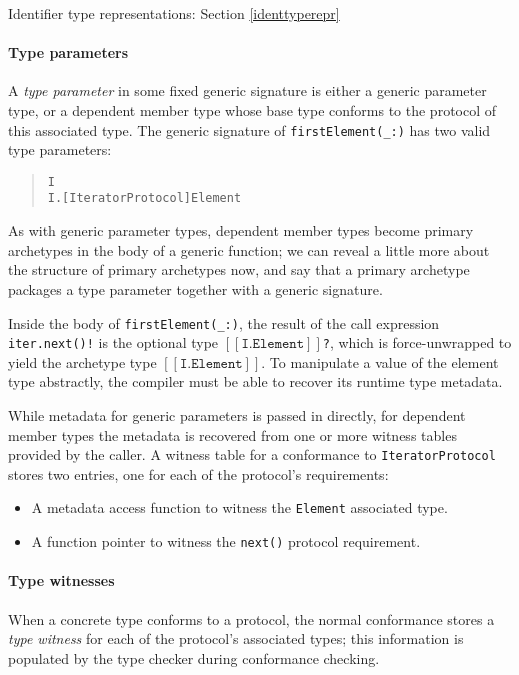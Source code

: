 \documentclass[a4paper,headsepline,bibliography=totoc,toc=flat,fleqn,twoside=semi]{scrbook}
\theoremstyle{definition}
\theoremstyle{definition}
\theoremstyle{definition}
\newcommand{\archetype}[1]{$[\![\texttt{#1}]\!]$}
\begin{document}
\begin{MoreDetails}
\item Identifier type representations: Section \ref{identtyperepr}
\end{MoreDetails}

\paragraph{Type parameters}
A \emph{type parameter} in some fixed generic signature is either a generic parameter type, or a dependent member type whose base type conforms to the protocol of this associated type. The generic signature of \verb|firstElement(_:)| has two valid type parameters:
\begin{quote}
\begin{verbatim}
I
I.[IteratorProtocol]Element
\end{verbatim}
\end{quote}

As with generic parameter types, dependent member types become primary archetypes in the body of a generic function; we can reveal a little more about the structure of primary archetypes now, and say that a primary archetype packages a type parameter together with a generic signature.

Inside the body of \verb|firstElement(_:)|, the result of the call expression \verb|iter.next()!| is the optional type \texttt{\archetype{I.Element}?}, which is force-unwrapped to yield the archetype type \archetype{I.Element}. To manipulate a value of the element type abstractly, the compiler must be able to recover its runtime type metadata.

While metadata for generic parameters is passed in directly, for dependent member types the metadata is recovered from one or more witness tables provided by the caller. A witness table for a conformance to \texttt{IteratorProtocol} stores two entries, one for each of the protocol's requirements:
\begin{itemize}
\item A metadata access function to witness the \texttt{Element} associated type.
\item A function pointer to witness the \texttt{next()} protocol requirement.
\end{itemize}

\paragraph{Type witnesses} When a concrete type conforms to a protocol, the normal conformance stores a \emph{type witness} for each of the protocol's associated types; this information is populated by the type checker during conformance checking.
\end{document}
